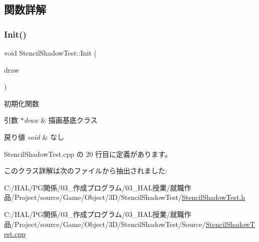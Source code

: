 \subsection{関数詳解}
\mbox{\label{class_stencil_shadow_test_a4a58695fafd134d750eb23ee5ec2bdb6}} 
\subsubsection{\texorpdfstring{Init()}{Init()}}
{\footnotesize\ttfamily void Stencil\+Shadow\+Test\+::\+Init (\begin{DoxyParamCaption}\item[{\mbox{\hyperlink{class_draw_base}{Draw\+Base}} $\ast$}]{draw }\end{DoxyParamCaption})}



初期化関数 


\begin{DoxyParams}{引数}
{\em $\ast$draw} & 描画基底クラス \\
\hline
\end{DoxyParams}

\begin{DoxyRetVals}{戻り値}
{\em void} & なし \\
\hline
\end{DoxyRetVals}


 Stencil\+Shadow\+Test.\+cpp の 20 行目に定義があります。



このクラス詳解は次のファイルから抽出されました\+:\begin{DoxyCompactItemize}
\item 
C\+:/\+H\+A\+L/\+P\+G関係/03\+\_\+作成プログラム/03\+\_\+\+H\+A\+L授業/就職作品/\+Project/source/\+Game/\+Object/3\+D/\+Stencil\+Shadow\+Test/\mbox{\hyperlink{_stencil_shadow_test_8h}{Stencil\+Shadow\+Test.\+h}}\item 
C\+:/\+H\+A\+L/\+P\+G関係/03\+\_\+作成プログラム/03\+\_\+\+H\+A\+L授業/就職作品/\+Project/source/\+Game/\+Object/3\+D/\+Stencil\+Shadow\+Test/\+Source/\mbox{\hyperlink{_stencil_shadow_test_8cpp}{Stencil\+Shadow\+Test.\+cpp}}\end{DoxyCompactItemize}
